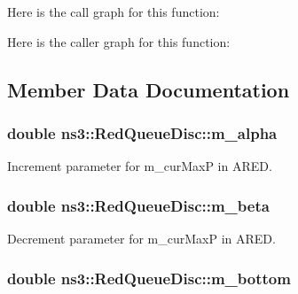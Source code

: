 Here is the call graph for this function\+:




Here is the caller graph for this function\+:




\subsection{Member Data Documentation}
\subsubsection[{\texorpdfstring{m\+\_\+alpha}{m_alpha}}]{\setlength{\rightskip}{0pt plus 5cm}double ns3\+::\+Red\+Queue\+Disc\+::m\+\_\+alpha\hspace{0.3cm}{\ttfamily [private]}}\hypertarget{classns3_1_1RedQueueDisc_a223d0381a0e067df135de67e1b261174}{}\label{classns3_1_1RedQueueDisc_a223d0381a0e067df135de67e1b261174}


Increment parameter for m\+\_\+cur\+MaxP in A\+R\+ED. 

\subsubsection[{\texorpdfstring{m\+\_\+beta}{m_beta}}]{\setlength{\rightskip}{0pt plus 5cm}double ns3\+::\+Red\+Queue\+Disc\+::m\+\_\+beta\hspace{0.3cm}{\ttfamily [private]}}\hypertarget{classns3_1_1RedQueueDisc_a7a31e5c2df52ee2da677fd6a4c4ff585}{}\label{classns3_1_1RedQueueDisc_a7a31e5c2df52ee2da677fd6a4c4ff585}


Decrement parameter for m\+\_\+cur\+MaxP in A\+R\+ED. 

\subsubsection[{\texorpdfstring{m\+\_\+bottom}{m_bottom}}]{\setlength{\rightskip}{0pt plus 5cm}double ns3\+::\+Red\+Queue\+Disc\+::m\+\_\+bottom\hspace{0.3cm}{\ttfamily [private]}}\hypertarget{classns3_1_1RedQueueDisc_a9a3204c76843c255e25de29ecca1a0b1}{}\label{classns3_1_1RedQueueDisc_a9a3204c76843c255e25de29ecca1a0b1}


